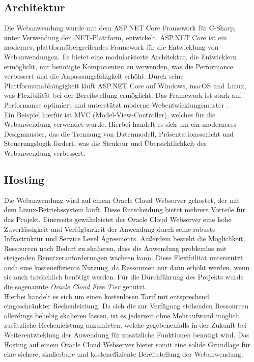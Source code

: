 \documentclass[conference]{IEEEtran}
\begin{document}
\subsection{Architektur}
Die Webanwendung wurde mit dem ASP.NET Core Framework für C-Sharp, unter Verwendung der .NET-Plattform, entwickelt. ASP.NET Core ist ein modernes, plattformübergreifendes Framework für die Entwicklung von Webanwendungen. Es bietet eine modularisierte Architektur, die Entwicklern ermöglicht, nur benötigte Komponenten zu verwenden, was die Performance verbessert und die Anpassungsfähigkeit erhöht. Durch seine Plattformunabhängigkeit läuft ASP.NET Core auf Windows, macOS und Linux, was Flexibilität bei der Bereitstellung ermöglicht. Das Framework ist stark auf Performance optimiert und unterstützt moderne Webentwicklungsmuster \cite{dotNET} \cite{csharp}. \\
Ein Beispiel hierfür ist MVC (Model-View-Controller), welches für die Webanwendung verwendet wurde. Hierbei handelt es sich um ein moderneres Designmuster, das die Trennung von Datenmodell, Präsentationsschicht und Steuerungslogik fördert, was die Struktur und Übersichtlichkeit der Webanwendung verbessert.
\subsection{Hosting}
Die Webanwendung wird auf einem Oracle Cloud Webserver gehostet, der mit dem Linux-Betriebssystem läuft. Diese Entscheidung bietet mehrere Vorteile für das Projekt. Einerseits gewährleistet der Oracle Cloud Webserver eine hohe Zuverlässigkeit und Verfügbarkeit der Anwendung durch seine robuste Infrastruktur und Service Level Agreements. Außerdem besteht die Möglichkeit, Ressourcen nach Bedarf zu skalieren, dass die Anwendung problemlos mit steigenden Benutzeranforderungen wachsen kann. Diese Flexibilität unterstützt auch eine kosteneffiziente Nutzung, da Ressourcen nur dann erhöht werden, wenn sie auch tatsächlich benötigt werden. Für die Durchführung des Projekts wurde die sogenannte \textit{Oracle Cloud Free Tier} genutzt. \\
Hierbei handelt es sich um einen kostenlosen Tarif mit entsprechend eingeschränkter Rechenleistung. Da sich die zur Verfügung stehenden Ressourcen allerdings beliebig skalieren lassen, ist es jederzeit ohne Mehraufwand möglich zusätzliche Rechenleistung anzumieten, welche gegebenenfalls in der Zukunft bei Weiterentwicklung der Anwendung für zusätzliche Funktionen benötigt wird. Das Hosting auf einem Oracle Cloud Webserver bietet somit eine solide Grundlage für eine sichere, skalierbare und kosteneffiziente Bereitstellung der Webanwendung. \\
\end{document}
